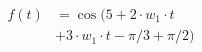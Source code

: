 \begin{center}
\begin{align*}
f(t) &= \cos( 5 + 2 \cdot w_1 \cdot t \\
&+ 3 \cdot w_1 \cdot t -\pi/3 +\pi/2)
\end{align*}
\end{center}
